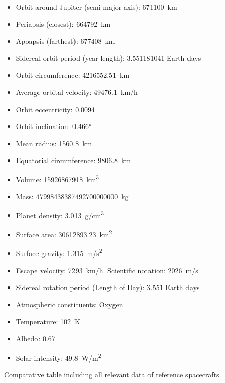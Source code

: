 \begin{itemize}
\item{Orbit around Jupiter (semi-major axis):} \SI{671100}{km}
\item{Periapsis (closest):} \SI{664792}{km}
\item{Apoapsis (farthest):} \SI{677408}{km}
\item{Sidereal orbit period (year length):} 3.551181041 Earth days
\item{Orbit circumference:} \SI{4216552.51}{km}
\item{Average orbital velocity:} \SI{49476.1}{km/h}
\item{Orbit eccentricity:} 0.0094
\item{Orbit inclination:} \ang{0.466}
\item{Mean radius:} \SI{1560.8}{km}
\item{Equatorial circumference:} \SI{9806.8}{km}
\item{Volume:} \SI{15926867918}{km^3}
\item{Mass:} \SI{47998438387492700000000}{kg}
\item{Planet density:} \SI{3.013}{g/cm^3}
\item{Surface area:} \SI{30612893.23}{km^2}
\item{Surface gravity:} \SI{1.315}{m/s^2}
\item{Escape velocity:} \SI{7293}{km/h}. Scientific notation: \SI{2026}{m/s}
\item{Sidereal rotation period (Length of Day):} 3.551 Earth days
\item{Atmospheric constituents:} Oxygen
\item{Temperature:} \SI{102}{K}
\item{Albedo:} 0.67
\item{Solar intensity:} \SI{49.8}{W/m^2}
\end{itemize}



Comparative table including all relevant data of reference
spacecrafts.

